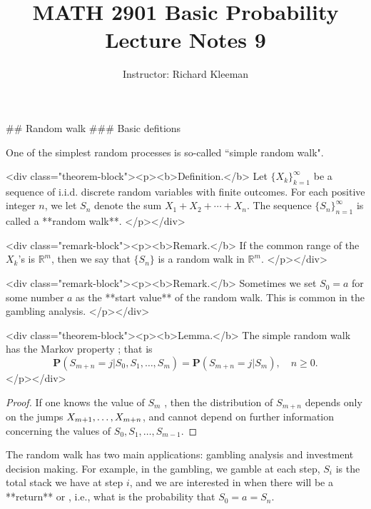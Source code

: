 


\title{MATH 2901 Basic Probability Lecture Notes 9}
\author{Instructor: Richard Kleeman}
\date{}
\maketitle


## Random walk
### Basic defitions

One of the simplest random processes is so-called ``simple 
random walk". 

<div class="theorem-block"><p><b>Definition.</b> 
Let $\{X_k\}_{k=1}^\infty$ be a sequence of i.i.d. discrete random variables with finite outcomes. For each positive integer $n$, we let $S_n$ denote the sum $X_1 +X_2 + \cdots + X_n$. The sequence $\{S_n\}_{n=1}^\infty$ is called a **random walk**.
</p></div>

<div class="remark-block"><p><b>Remark.</b> 
If the common range of the $X_k$’s is $\mathbb{R}^m$, then we say that $\{S_n\}$ is a random walk in $\mathbb{R}^m$.
</p></div>

<div class="remark-block"><p><b>Remark.</b> 
Sometimes we set $S_0 = a$ for some number $a$ as the **start value** of the random walk. This is common in the gambling analysis.
</p></div>

<div class="theorem-block"><p><b>Lemma.</b> 
The simple random walk has the Markov property ; that is
$$\begin{equation}
    \mathbf{P}\left(S_{m+n}=j | S_{0}, S_{1}, \ldots, S_{m}\right)=\mathbf{P}\left(S_{m+n}=j | S_{m}\right), \quad n \geq 0.
\end{equation}$$
</p></div>

\begin{proof}
If one knows the value of $S_m$ , then the distribution of $S_{m+n}$ depends only on the jumps $X_{m+ 1} ,\dots, \\ X_{m+n}$, and cannot depend on further information concerning the values of $S_0, S_1, \dots , S_{m-1}$.
\end{proof}

The random walk has two main applications: gambling analysis and investment decision making. For example, in the gambling, we gamble at each step, $S_i$ is the total stack we have at step $i$, and we are interested in when there will be a **return** or , i.e., what is the probability that $S_0 = a = S_n$.


